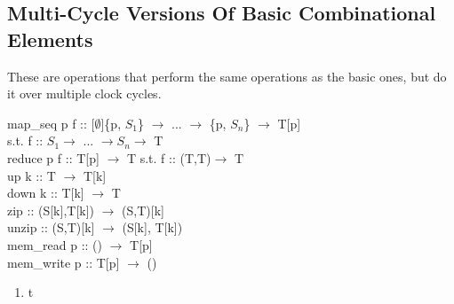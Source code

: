 \documentclass[11pt,fleqn]{article}
\numberwithin{equation}{subsection}
\begin{document}
\subsection{Multi-Cycle Versions Of Basic Combinational Elements}
These are operations that perform the same operations as the basic ones, but
do it over multiple clock cycles.
\begin{adjustwidth}{2.5 em}{0 pt}
    map\_seq p f :: [$\emptyset$]\{p, $S_1$\} $\rightarrow$ ... $\rightarrow$ \{p, $S_n$\} $\rightarrow$ 
    T[p] \\ \null \qquad s.t. f :: $S_1 \rightarrow$ ... $\rightarrow S_n \rightarrow$ T \\
    reduce p f :: T[p] $\rightarrow$ T \qquad s.t. f :: (T,T)$\rightarrow$ T \\
    up k :: T $\rightarrow$ T[k] \\
    down k :: T[k] $\rightarrow$ T \\
    zip :: (S[k],T[k]) $\rightarrow$ (S,T)[k] \\
    unzip :: (S,T)[k] $\rightarrow$ (S[k], T[k]) \\
    mem\_read p :: () $\rightarrow$ T[p] \\
    mem\_write p :: T[p] $\rightarrow$ ()
\end{adjustwidth}
\begin{enumerate}
    \item t
\end{enumerate}
\end{document}
